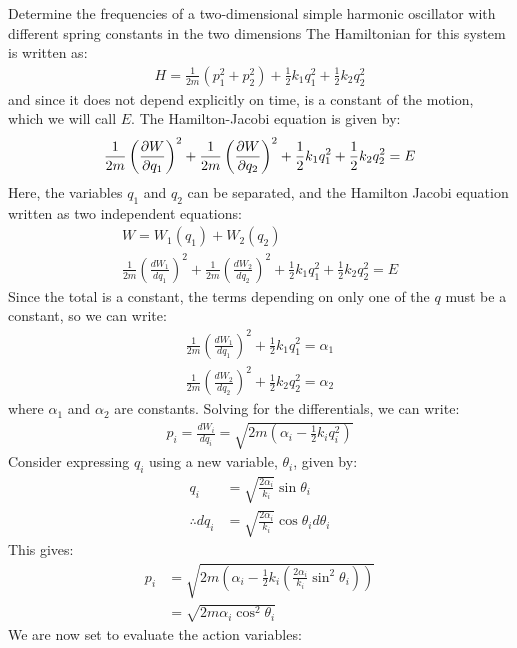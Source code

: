 \begin{example}{0pt}{Determine the frequencies of a two-dimensional simple harmonic oscillator with different spring constants in the two dimensions}{}
The Hamiltonian for this system is written as:
\begin{align*}
H=\frac{1}{2m}(p_1^2+p_2^2)+\frac{1}{2}k_1q_1^2+\frac{1}{2}k_2q_2^2
\end{align*}
and since it does not depend explicitly on time, is a constant of the motion, which we will call $E$. The Hamilton-Jacobi equation is given by:
\begin{align*}
\frac{1}{2m}\left(\frac{\partial W}{\partial q_1}\right)^2+\frac{1}{2m}\left(\frac{\partial W}{\partial q_2}\right)^2+\frac{1}{2}k_1q_1^2+\frac{1}{2}k_2q_2^2=E
\end{align*}
Here, the variables $q_1$ and $q_2$ can be separated, and the Hamilton Jacobi equation written as two independent equations:
\begin{align*}
W=W_1(q_1)+W_2(q_2)\\
\frac{1}{2m}\left(\frac{dW_1}{dq_1}\right)^2+\frac{1}{2m}\left(\frac{dW_2}{dq_2}\right)^2+\frac{1}{2}k_1q_1^2+\frac{1}{2}k_2q_2^2=E
\end{align*}
Since the total is a constant, the terms depending on only one of the $q$ must be a constant, so we can write:
\begin{align*}
\frac{1}{2m}\left(\frac{dW_1}{dq_1}\right)^2+\frac{1}{2}k_1q_1^2=\alpha_1\\
\frac{1}{2m}\left(\frac{dW_2}{dq_2}\right)^2+\frac{1}{2}k_2q_2^2=\alpha_2
\end{align*}
where $\alpha_1$ and $\alpha_2$ are constants. Solving for the differentials, we can write:
\begin{align*}
p_i=\frac{dW_i}{dq_i}=\sqrt{2m(\alpha_i-\frac{1}{2}k_iq_i^2)}
\end{align*}
Consider expressing $q_i$ using a new variable, $\theta_i$, given by:
\begin{align*}
q_i&=\sqrt{\frac{2\alpha_i}{k_i}}\sin\theta_i\\
\therefore dq_i&=\sqrt{\frac{2\alpha_i}{k_i}}\cos\theta_id\theta_i
\end{align*}
This gives:
\begin{align*}
p_i&=\sqrt{2m\left(\alpha_i-\frac{1}{2}k_i(\frac{2\alpha_i}{k_i}\sin^2\theta_i)\right)}\\
&=\sqrt{2m\alpha_i\cos^2\theta_i}
\end{align*}
We are now set to evaluate the action variables:
\begin{align*}

\end{align*}
\end{example}
